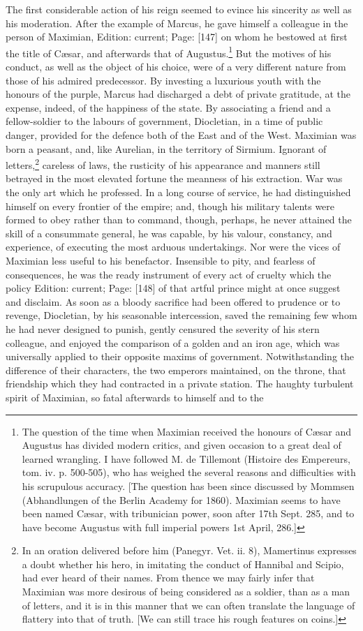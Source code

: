 The first considerable action of his reign seemed to evince his sincerity as well as his moderation. After the example of Marcus, he gave himself a colleague in the person of Maximian, Edition: current; Page: [147] on whom he bestowed at first the title of Cæsar, and afterwards that of Augustus.\footnote{The question of the time when Maximian received the honours of Cæsar and Augustus has divided modern critics, and given occasion to a great deal of learned wrangling. I have followed M. de Tillemont (Histoire des Empereurs, tom. iv. p. 500-505), who has weighed the several reasons and difficulties with his scrupulous accuracy. [The question has been since discussed by Mommsen (Abhandlungen of the Berlin Academy for 1860). Maximian seems to have been named Cæsar, with tribunician power, soon after 17th Sept. 285, and to have become Augustus with full imperial powers 1st April, 286.]} But the motives of his conduct, as well as the object of his choice, were of a very different nature from those of his admired predecessor. By investing a luxurious youth with the honours of the purple, Marcus had discharged a debt of private gratitude, at the expense, indeed, of the happiness of the state. By associating a friend and a fellow-soldier to the labours of government, Diocletian, in a time of public danger, provided for the defence both of the East and of the West. Maximian was born a peasant, and, like Aurelian, in the territory of Sirmium. Ignorant of letters,\footnote{In an oration delivered before him (Panegyr. Vet. ii. 8), Mamertinus expresses a doubt whether his hero, in imitating the conduct of Hannibal and Scipio, had ever heard of their names. From thence we may fairly infer that Maximian was more desirous of being considered as a soldier, than as a man of letters, and it is in this manner that we can often translate the language of flattery into that of truth. [We can still trace his rough features on coins.]} careless of laws, the rusticity of his appearance and manners still betrayed in the most elevated fortune the meanness of his extraction. War was the only art which he professed. In a long course of service, he had distinguished himself on every frontier of the empire; and, though his military talents were formed to obey rather than to command, though, perhaps, he never attained the skill of a consummate general, he was capable, by his valour, constancy, and experience, of executing the most arduous undertakings. Nor were the vices of Maximian less useful to his benefactor. Insensible to pity, and fearless of consequences, he was the ready instrument of every act of cruelty which the policy Edition: current; Page: [148] of that artful prince might at once suggest and disclaim. As soon as a bloody sacrifice had been offered to prudence or to revenge, Diocletian, by his seasonable intercession, saved the remaining few whom he had never designed to punish, gently censured the severity of his stern colleague, and enjoyed the comparison of a golden and an iron age, which was universally applied to their opposite maxims of government. Notwithstanding the difference of their characters, the two emperors maintained, on the throne, that friendship which they had contracted in a private station. The haughty turbulent spirit of Maximian, so fatal afterwards to himself and to the 